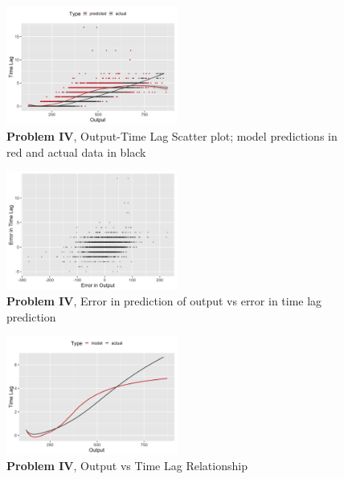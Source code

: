 \documentclass[twoside]{article}
\begin{document}
\begin{figure}[h]
\vspace{.3in}
\centerline{\includegraphics[width=0.5\textwidth]{figures/exp4_scatter_v_tl.png}}
\vspace{.3in}
\caption{\textbf{Problem IV}, Output-Time Lag Scatter plot; model predictions in red and actual data in black}
\label{fig:problem4_scatter}
\end{figure}

\begin{figure}[h]
\vspace{.3in}
\centerline{\includegraphics[width=0.5\textwidth]{figures/exp4_scatter_errors_test.png}}
\vspace{.3in}
\caption{\textbf{Problem IV}, Error in prediction of output vs error in time lag prediction}
\label{fig:problem4_error}
\end{figure}

\begin{figure}[h]
\vspace{.3in}
\centerline{\includegraphics[width=0.5\textwidth]{figures/exp4_predictive_curves.png}}
\vspace{.3in}
\caption{\textbf{Problem IV}, Output vs Time Lag Relationship}
\label{fig:problem4_curves}
\end{figure}
\end{document}
